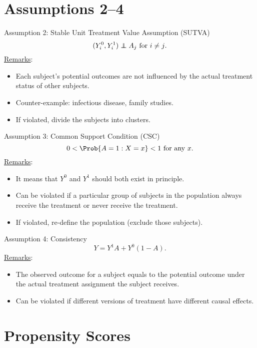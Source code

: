 \section{Assumptions 2--4}
\begin{Regular}{Assumption 2: Stable Unit Treatment Value Assumption (SUTVA)}
    \[ (Y_i^0,Y_i^1)\indep A_j\text{ for $i\ne j$}. \]
    \tcblower{}
    \underline{Remarks}:
    \begin{itemize}
        \item Each subject's potential outcomes are not influenced by the
              actual treatment status of other subjects.
        \item Counter-example: infectious disease, family studies.
        \item If violated, divide the subjects into clusters.
    \end{itemize}
\end{Regular}
\begin{Regular}{Assumption 3: Common Support Condition (CSC)}
    \[ 0<\Prob{A=1\given X=x}<1\text{ for any $x$}. \]
    \tcblower{}
    \underline{Remarks}:
    \begin{itemize}
        \item It means that $ Y^0 $ and $ Y^1 $ should both exist in principle.
        \item Can be violated if a particular group of subjects in the
              population always receive the treatment or never receive the
              treatment.
        \item If violated, re-define the population (exclude those subjects).
    \end{itemize}
\end{Regular}
\begin{Regular}{Assumption 4: Consistency}
    \[ Y=Y^1 A+Y^0(1-A). \]
    \tcblower{}
    \underline{Remarks}:
    \begin{itemize}
        \item The observed outcome for a subject equals to the potential
              outcome under the actual treatment assignment the subject
              receives.
        \item Can be violated if different versions of treatment have
              different causal effects.
    \end{itemize}
\end{Regular}
\section{Propensity Scores}
